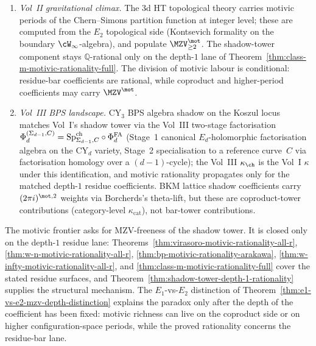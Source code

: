 \begin{enumerate}
\item[(i)] \emph{Vol~II gravitational climax.} The 3d HT topological
theory carries motivic periods of the Chern--Simons partition
function at integer level; these are computed from the $E_2$
topological side (Kontsevich formality on the boundary
$\cW_{\infty}$-algebra), and populate $\MZV^{\mot}_{\geq 2}$. The
shadow-tower component stays $\mathbb{Q}$-rational only on the
depth-$1$ lane of
Theorem~\ref{thm:class-m-motivic-rationality-full}. The division of
motivic labour is conditional: residue-bar coefficients are rational,
while coproduct and higher-period coefficients may carry
$\MZV^{\mot}$.
\item[(ii)] \emph{Vol~III BPS landscape.} CY$_3$ BPS algebra
shadow on the Koszul locus matches Vol~I's shadow tower via the
Vol~III two-stage factorisation
$\Phi_d^{(\Sigma_{d-1},C)} = \mathrm{Sp}^{\mathrm{ch}}_{\Sigma_{d-1}, C} \circ \Phi^{\mathrm{FA}}_d$
(Stage~1 canonical $E_d$-holomorphic factorisation algebra on the
CY$_d$ variety, Stage~2 specialisation to a reference curve~$C$
via factorisation homology over a $(d{-}1)$-cycle); the Vol~III
$\kappa_{\ch}$
is the Vol~I $\kappa$ under this identification, and motivic
rationality propagates only for the matched depth-$1$ residue
coefficients. BKM lattice shadow coefficients carry
$(2\pi i)^{\mot, 2}$ weights via Borcherds's theta-lift, but these
are coproduct-tower contributions (category-level $\kappa_{\mathrm{cat}}$),
not bar-tower contributions.
\end{enumerate}

\begin{remark}
The motivic frontier asks for MZV-freeness
of the shadow tower. It is closed only on the depth-$1$ residue lane:
Theorems~\ref{thm:virasoro-motivic-rationality-all-r},
\ref{thm:w-n-motivic-rationality-all-r},
\ref{thm:bp-motivic-rationality-arakawa},
\ref{thm:w-infty-motivic-rationality-all-r}, and
\ref{thm:class-m-motivic-rationality-full} cover the stated residue
surfaces, and Theorem~\ref{thm:shadow-tower-depth-1-rationality}
supplies the structural mechanism. The $E_1$-vs-$E_2$ distinction of
Theorem~\ref{thm:e1-vs-e2-mzv-depth-distinction} explains the
paradox only after the depth of the coefficient has been fixed:
motivic richness can live on the coproduct side or on higher
configuration-space periods, while the proved rationality concerns
the residue-bar lane.
\end{remark}

